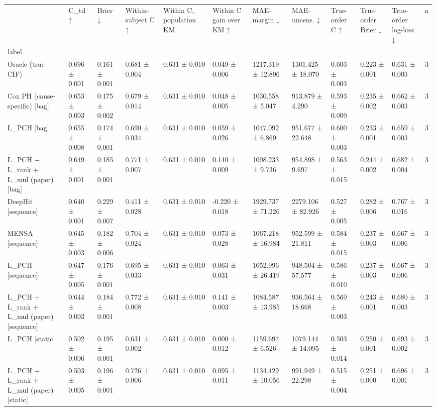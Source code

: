 \begin{tabular}{lllllllllllr}
\toprule
 & C\_td ↑ & Brier ↓ & Within-subject C ↑ & Within C, population KM & Within C gain over KM ↑ & MAE-margin ↓ & MAE-uncens. ↓ & True-order C ↑ & True-order Brier ↓ & True-order log-loss ↓ & n \\
label &  &  &  &  &  &  &  &  &  &  &  \\
\midrule
Oracle (true CIF) & 0.696 ± 0.001 & 0.161 ± 0.001 & 0.681 ± 0.004 & 0.631 ± 0.010 & 0.049 ± 0.006 & 1217.319 ± 12.896 & 1301.425 ± 18.070 & 0.603 ± 0.003 & 0.223 ± 0.001 & 0.631 ± 0.003 & 3 \\
Cox PH (cause-specific) [bag] & 0.653 ± 0.003 & 0.175 ± 0.002 & 0.679 ± 0.014 & 0.631 ± 0.010 & 0.048 ± 0.005 & 1030.558 ± 5.047 & 913.879 ± 4.290 & 0.593 ± 0.009 & 0.235 ± 0.002 & 0.662 ± 0.003 & 3 \\
L\_PCH [bag] & 0.655 ± 0.008 & 0.174 ± 0.001 & 0.690 ± 0.034 & 0.631 ± 0.010 & 0.059 ± 0.026 & 1047.092 ± 6.869 & 951.677 ± 22.648 & 0.600 ± 0.003 & 0.233 ± 0.001 & 0.659 ± 0.003 & 3 \\
L\_PCH + L\_rank + L\_mul (paper) [bag] & 0.649 ± 0.001 & 0.185 ± 0.001 & 0.771 ± 0.007 & 0.631 ± 0.010 & 0.140 ± 0.009 & 1098.233 ± 9.736 & 954.898 ± 9.697 & 0.563 ± 0.015 & 0.244 ± 0.002 & 0.682 ± 0.004 & 3 \\
DeepHit [sequence] & 0.640 ± 0.001 & 0.229 ± 0.007 & 0.411 ± 0.028 & 0.631 ± 0.010 & -0.220 ± 0.018 & 1929.737 ± 71.226 & 2279.106 ± 82.926 & 0.527 ± 0.005 & 0.282 ± 0.006 & 0.767 ± 0.016 & 3 \\
MENSA [sequence] & 0.645 ± 0.003 & 0.182 ± 0.006 & 0.704 ± 0.024 & 0.631 ± 0.010 & 0.073 ± 0.028 & 1067.218 ± 16.984 & 952.599 ± 21.811 & 0.584 ± 0.015 & 0.237 ± 0.003 & 0.667 ± 0.006 & 3 \\
L\_PCH [sequence] & 0.647 ± 0.005 & 0.176 ± 0.001 & 0.695 ± 0.033 & 0.631 ± 0.010 & 0.063 ± 0.031 & 1052.996 ± 26.419 & 948.504 ± 57.577 & 0.586 ± 0.010 & 0.237 ± 0.003 & 0.667 ± 0.006 & 3 \\
L\_PCH + L\_rank + L\_mul (paper) [sequence] & 0.644 ± 0.003 & 0.184 ± 0.001 & 0.772 ± 0.008 & 0.631 ± 0.010 & 0.141 ± 0.003 & 1084.587 ± 13.985 & 936.564 ± 18.668 & 0.569 ± 0.003 & 0.243 ± 0.001 & 0.680 ± 0.003 & 3 \\
L\_PCH [static] & 0.502 ± 0.006 & 0.195 ± 0.001 & 0.631 ± 0.002 & 0.631 ± 0.010 & 0.000 ± 0.012 & 1159.697 ± 6.526 & 1079.144 ± 14.095 & 0.503 ± 0.014 & 0.250 ± 0.001 & 0.693 ± 0.002 & 3 \\
L\_PCH + L\_rank + L\_mul (paper) [static] & 0.503 ± 0.005 & 0.196 ± 0.001 & 0.726 ± 0.006 & 0.631 ± 0.010 & 0.095 ± 0.011 & 1134.429 ± 10.056 & 991.949 ± 22.298 & 0.515 ± 0.004 & 0.251 ± 0.000 & 0.696 ± 0.001 & 3 \\
\bottomrule
\end{tabular}
